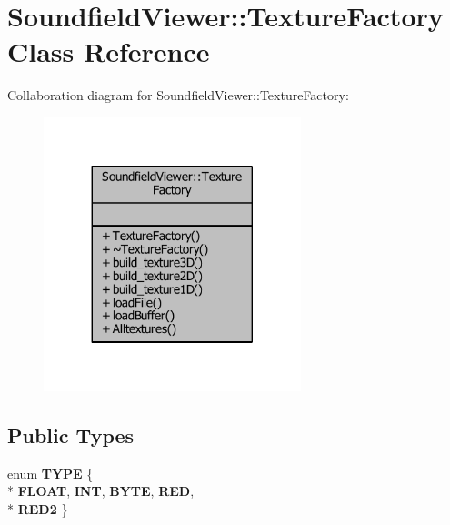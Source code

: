 \section{Soundfield\-Viewer\-:\-:Texture\-Factory Class Reference}
\label{classSoundfieldViewer_1_1TextureFactory}


Collaboration diagram for Soundfield\-Viewer\-:\-:Texture\-Factory\-:\nopagebreak
\begin{figure}[H]
\begin{center}
\leavevmode
\includegraphics[width=212pt]{d6/de9/classSoundfieldViewer_1_1TextureFactory__coll__graph}
\end{center}
\end{figure}
\subsection*{Public Types}
\begin{DoxyCompactItemize}
\item 
enum {\bfseries T\-Y\-P\-E} \{ \\*
{\bfseries F\-L\-O\-A\-T}, 
{\bfseries I\-N\-T}, 
{\bfseries B\-Y\-T\-E}, 
{\bfseries R\-E\-D}, 
\\*
{\bfseries R\-E\-D2}
 \}
\end{DoxyCompactItemize}
